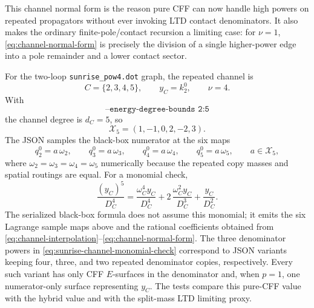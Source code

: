 \documentclass[11pt,a4paper]{report}
\newcommand{\Samples}{\mathcal X}
\begin{document}
This channel normal form is the reason pure CFF can now handle high powers on
repeated propagators without ever invoking LTD contact denominators.  It also
makes the ordinary finite-pole/contact recursion a limiting case: for
\(\nu=1\), \eqref{eq:channel-normal-form} is precisely the division of a
single higher-power edge into a pole remainder and a lower contact sector.

For the two-loop \texttt{sunrise\_pow4.dot} graph, the repeated channel is
\[
  C=\{2,3,4,5\},\qquad y_C=k_2^0,\qquad \nu=4 .
\]
With
\[
  \texttt{--energy-degree-bounds 2:5}
\]
the channel degree is \(d_C=5\), so
\[
  \Samples_5=(1,-1,0,2,-2,3).
\]
The JSON samples the black-box numerator at the six maps
\[
  q_2^0=a\,\omega_2,\qquad
  q_3^0=a\,\omega_3,\qquad
  q_4^0=a\,\omega_4,\qquad
  q_5^0=a\,\omega_5,
  \qquad a\in\Samples_5,
\]
where \(\omega_2=\omega_3=\omega_4=\omega_5\) numerically because the repeated
copy masses and spatial routings are equal.  For a monomial check,
\[
  \frac{(y_C)^5}{D_C^4}
  =
  \frac{\omega_C^4 y_C}{D_C^4}
  +2\,\frac{\omega_C^2 y_C}{D_C^3}
  +\frac{y_C}{D_C^2}.
  \label{eq:sunrise-channel-monomial-check}
\]
The serialized black-box formula does not assume this monomial; it emits the
six Lagrange sample maps above and the rational coefficients obtained from
\eqref{eq:channel-interpolation}--\eqref{eq:channel-normal-form}.  The three
denominator powers in \eqref{eq:sunrise-channel-monomial-check} correspond to
JSON variants keeping four, three, and two repeated denominator copies,
respectively.  Every such variant has only CFF \(E\)-surfaces in the
denominator and, when \(p=1\), one numerator-only surface representing
\(y_C\).  The tests compare this pure-CFF value with the hybrid value and with
the split-mass LTD limiting proxy.
\end{document}
